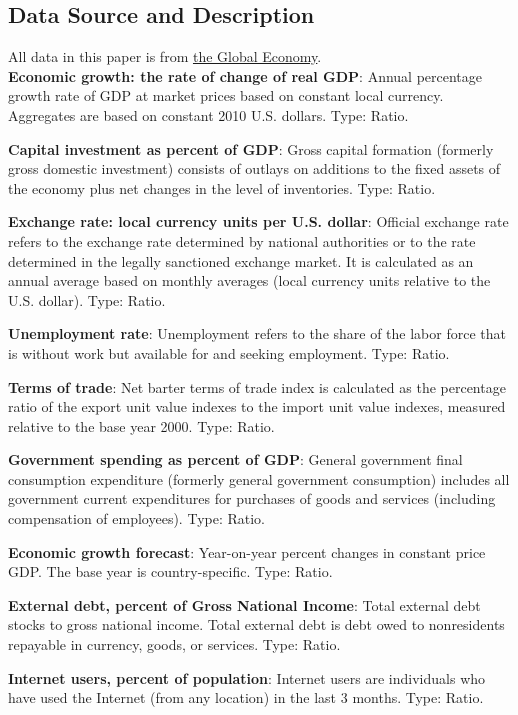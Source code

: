 \documentclass[11pt]{article}
\begin{document}
\begin{appendices}
\section{Data Source and Description}
All data in this paper is from \href{https://www.theglobaleconomy.com/download-data.php}{the Global Economy}.\\

\textbf{Economic growth: the rate of change of real GDP}: Annual percentage growth rate of GDP at market prices based on constant local currency. Aggregates are based on constant 2010 U.S. dollars. Type: Ratio.

\textbf{Capital investment as percent of GDP}: Gross capital formation (formerly gross domestic investment) consists of outlays on additions to the fixed assets of the economy plus net changes in the level of inventories. Type: Ratio.

\textbf{Exchange rate: local currency units per U.S. dollar}: Official exchange rate refers to the exchange rate determined by national authorities or to the rate determined in the legally sanctioned exchange market. It is calculated as an annual average based on monthly averages (local currency units relative to the U.S. dollar). Type: Ratio.

\textbf{Unemployment rate}: Unemployment refers to the share of the labor force that is without work but available for and seeking employment. Type: Ratio.

\textbf{Terms of trade}: Net barter terms of trade index is calculated as the percentage ratio of the export unit value indexes to the import unit value indexes, measured relative to the base year 2000. Type: Ratio.

\textbf{Government spending as percent of GDP}: General government final consumption expenditure (formerly general government consumption) includes all government current expenditures for purchases of goods and services (including compensation of employees). Type: Ratio.

\textbf{Economic growth forecast}: Year-on-year percent changes in constant price GDP. The base year is country-specific. Type: Ratio.

\textbf{External debt, percent of Gross National Income}: Total external debt stocks to gross national income. Total external debt is debt owed to nonresidents repayable in currency, goods, or services. Type: Ratio.

\textbf{Internet users, percent of population}: Internet users are individuals who have used the Internet (from any location) in the last 3 months. Type: Ratio.


\end{appendices}
\end{document}
